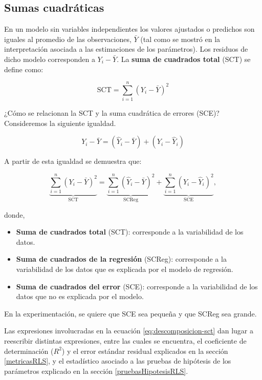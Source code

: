 \documentclass[
  11pt,
]{book}
\theoremstyle{definition}
\theoremstyle{definition}
\theoremstyle{definition}
\theoremstyle{definition}
\theoremstyle{remark}
\begin{document}
\subsection{Sumas cuadráticas}\label{sumascuadraticas}

En un modelo sin variables independientes los valores ajustados o predichos son iguales al promedio de las observaciones, \(\bar{Y}\) (tal como se mostró en la interpretación asociada a las estimaciones de los parámetros). Los residuos de dicho modelo corresponden a \(Y_i - \bar{Y}\). La \textbf{suma de cuadrados total} (SCT) se define como:

\begin{equation}
\text{SCT} = \sum_{i=1}^n\left( Y_i - \bar{Y} \right)^2
\label{eq:SCT}
\end{equation}

¿Cómo se relacionan la SCT y la suma cuadrática de errores (SCE)? Consideremos la siguiente igualdad.

\begin{equation}
Y_i - \bar{Y} = \left( \widehat{Y}_i - \bar{Y} \right) + \left( Y_i - \widehat{Y}_i \right)
\label{eq:SCT-SCE-SCReg}
\end{equation}

A partir de esta igualdad se demuestra que:

\begin{equation}
\underbrace{\sum_{i=1}^n\left( Y_i - \bar{Y} \right)^2}_{\text{SCT}} = \underbrace{\sum_{i=1}^n\left( \widehat{Y}_i - \bar{Y} \right)^2}_{\text{SCReg}} + \underbrace{\sum_{i=1}^n\left( Y_i - \widehat{Y}_i \right)^2}_{\text{SCE}},
\label{eq:descomposicion-sct}
\end{equation}

donde,

\begin{itemize}
\item
  \textbf{Suma de cuadrados total} (SCT): corresponde a la variabilidad de los datos.
\item
  \textbf{Suma de cuadrados de la regresión} (SCReg): corresponde a la variabilidad de los datos que es explicada por el modelo de regresión.
\item
  \textbf{Suma de cuadrados del error} (SCE): corresponde a la variabilidad de los datos que no es explicada por el modelo.
\end{itemize}

En la experimentación, se quiere que SCE sea pequeña y que SCReg sea grande.

Las expresiones involucradas en la ecuación \eqref{eq:descomposicion-sct} dan lugar a reescribir distintas expresiones, entre las cuales se encuentra, el coeficiente de determinación (\(R^2\)) y el error estándar residual explicados en la sección \ref{metricasRLS}, y el estadístico asociado a las pruebas de hipótesis de los parámetros explicado en la sección \ref{pruebasHipotesisRLS}.
\end{document}
